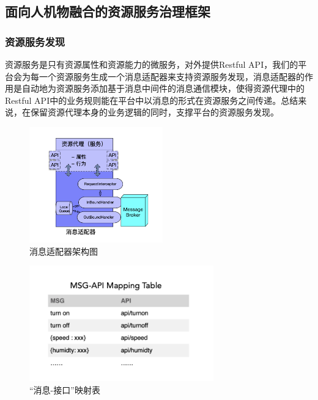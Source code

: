 \documentclass[a4paper, 12pt]{article}
\theoremstyle{definition}
\begin{document}
\subsection{面向人机物融合的资源服务治理框架}
\subsubsection{资源服务发现}
资源服务是只有资源属性和资源能力的微服务，对外提供Restful API，我们的平台会为每一个资源服务生成一个消息适配器来支持资源服务发现，消息适配器的作用是自动地为资源服务添加基于消息中间件的消息通信模块，使得资源代理中的Restful API中的业务规则能在平台中以消息的形式在资源服务之间传递。总结来说，在保留资源代理本身的业务逻辑的同时，支撑平台的资源服务发现。
\begin{figure}[ht]
 \centering
 \includegraphics[height=5cm]{images/msg_adapter.png}
 \caption{消息适配器架构图}
 \label{fig:singleblock}
\end{figure}

 \begin{figure}[ht]
 \centering
 \includegraphics[height=5cm]{images/msg-api_mapping_table.png}
 \caption{“消息-接口”映射表}
 \label{fig:singleblock}
\end{figure}
\end{document}
